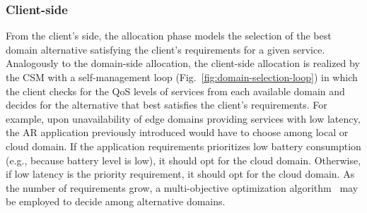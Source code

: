 

\subsubsection*{Client-side} From the client's side, the allocation phase models the selection of the best domain alternative satisfying the client's requirements for a given service. 
Analogously to the domain-side allocation, the client-side allocation is realized by the CSM with a self-management loop (Fig.~\ref{fig:domain-selection-loop}) in which the client checks for the QoS levels of services from each available domain and decides for the alternative that best satisfies the client's requirements. 
For example, upon unavailability of edge domains providing services with low latency, the AR application previously introduced would have to choose among local or cloud domain. If the application requirements prioritizes low battery consumption (e.g., because battery level is low), it should opt for the cloud domain. Otherwise, if low latency is the priority requirement, it should opt for the cloud domain. As the number of requirements grow, a multi-objective optimization algorithm~\cite{Olson1996} may be employed to decide among alternative domains.






